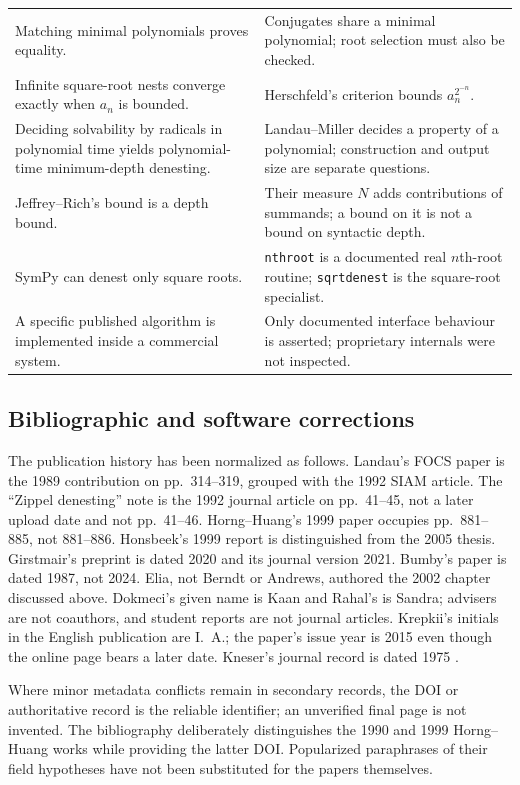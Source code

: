\documentclass[11pt,oneside]{article}
\numberwithin{equation}{section}
\theoremstyle{definition}
\theoremstyle{remark}
\begin{document}
\begin{longtable}{@{}p{}p{}@{}}
Matching minimal polynomials proves equality. & Conjugates share a minimal polynomial; root selection must also be checked.\\[5pt]
Infinite square-root nests converge exactly when $a_n$ is bounded. & Herschfeld's criterion bounds $a_n^{2^{-n}}$.\\[5pt]
Deciding solvability by radicals in polynomial time yields polynomial-time minimum-depth denesting. & Landau--Miller decides a property of a polynomial; construction and output size are separate questions.\\[5pt]
Jeffrey--Rich's bound is a depth bound. & Their measure $N$ adds contributions of summands; a bound on it is not a bound on syntactic depth.\\[5pt]
SymPy can denest only square roots. & \texttt{nthroot} is a documented real $n$th-root routine; \texttt{sqrtdenest} is the square-root specialist.\\[5pt]
A specific published algorithm is implemented inside a commercial system. & Only documented interface behaviour is asserted; proprietary internals were not inspected.\\
\end{longtable}

\subsection{Bibliographic and software corrections}
The publication history has been normalized as follows. Landau's FOCS paper is the 1989 contribution on pp.~314--319, grouped with the 1992 SIAM article. The ``Zippel denesting'' note is the 1992 journal article on pp.~41--45, not a later upload date and not pp.~41--46. Horng--Huang's 1999 paper occupies pp.~881--885, not 881--886. Honsbeek's 1999 report is distinguished from the 2005 thesis. Girstmair's preprint is dated 2020 and its journal version 2021. Bumby's paper is dated 1987, not 2024. Elia, not Berndt or Andrews, authored the 2002 chapter discussed above. Dokmeci's given name is Kaan and Rahal's is Sandra; advisers are not coauthors, and student reports are not journal articles. Krepkii's initials in the English publication are I.~A.; the paper's issue year is 2015 even though the online page bears a later date. Kneser's journal record is dated 1975 \cite{landau,landauzippel,hornghuang,honsbeek99,honsbeek,girstmair,bumby,elia,dokmeci,rahal,krepkii,kneser}.

Where minor metadata conflicts remain in secondary records, the DOI or authoritative record is the reliable identifier; an unverified final page is not invented. The bibliography deliberately distinguishes the 1990 and 1999 Horng--Huang works while providing the latter DOI. Popularized paraphrases of their field hypotheses have not been substituted for the papers themselves.
\end{document}
